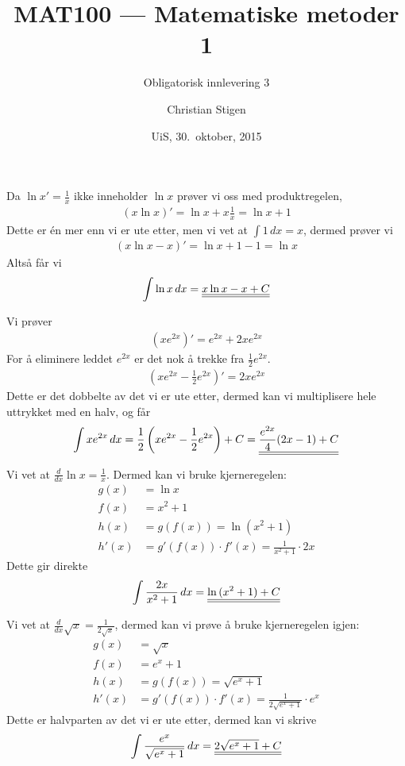 \documentclass[a4paper,norsk,12pt]{article}
\title{MAT100 --- Matematiske metoder 1}
\subtitle{Obligatorisk innlevering 3}
\author{Christian Stigen}
\date{UiS, 30.~oktober, 2015}
\begin{document}
\maketitle

Da $\ln{x}' = \frac{1}{x}$ ikke inneholder $\ln{x}$ prøver vi oss med
produktregelen,
\begin{align*}
  \left( x \ln{x} \right)' = \ln{x} + x\frac{1}{x} = \ln{x} + 1
\end{align*}
Dette er én mer enn vi er ute etter, men vi vet at $\int 1 \,dx = x$, dermed
prøver vi
\begin{align*}
  \left( x \ln{x} - x\right)' = \ln{x} + 1 - 1 = \ln{x}
\end{align*}
Altså får vi
\begin{align*}
  \int \ln{x} \,dx = {\underline{\underline{x\ln{x} - x + C}}}
\end{align*}


Vi prøver
\begin{align*}
 \left( x e^{2x} \right)' = e^{2x} + 2x e^{2x}
\end{align*}
For å eliminere leddet $e^{2x}$ er det nok å trekke fra
$\frac{1}{2}e^{2x}$.
\begin{align*}
  \left( x e^{2x} - \frac{1}{2}e^{2x} \right)' = 2x e^{2x}
\end{align*}
Dette er det dobbelte av det vi er ute etter, dermed kan vi multiplisere hele
uttrykket med en halv, og får
\begin{align*}
  \int x e^{2x} \,dx = \frac{1}{2}\left( x e^{2x} - \frac{1}{2} e^{2x} \right)
  + C
  = {\underline{\underline{\frac{e^{2x}}{4}(2x - 1) + C}}}
\end{align*}


Vi vet at $\frac{d}{dx}\ln{x} = \frac{1}{x}$. Dermed kan vi bruke
kjerneregelen:
\begin{align*}
  g(x) &= \ln{x} \\
  f(x) &= x^2+1 \\
  h(x) &= g(f(x)) = \ln{(x^2+1)} \\
  h'(x) &= g'(f(x)) \cdot f'(x) = \frac{1}{x^2+1} \cdot 2x
\end{align*}
Dette gir direkte
\begin{align*}
  \int \frac{2x}{x^2+1} \,dx = {\underline{\underline{\ln{(x^2+1)} + C}}}
\end{align*}

Vi vet at $\frac{d}{dx}\sqrt{x} = \frac{1}{2\sqrt{x}}$, dermed kan vi prøve å
bruke kjerneregelen igjen:
\begin{align*}
  g(x) &= \sqrt{x} \\
  f(x) &= e^x+1 \\
  h(x) &= g(f(x)) = \sqrt{e^x+1} \\
  h'(x) &= g'(f(x)) \cdot f'(x) = \frac{1}{2\sqrt{e^x+1}} \cdot e^x
\end{align*}
Dette er halvparten av det vi er ute etter, dermed kan vi skrive
\begin{align*}
  \int \frac{e^x}{\sqrt{e^x+1}} \,dx = {\underline{\underline{2\sqrt{e^x+1} + C}}}
\end{align*}
\end{document}
